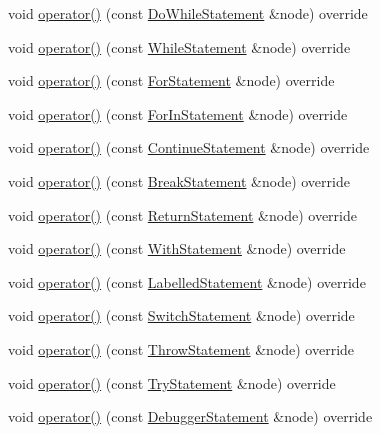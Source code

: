 \begin{DoxyCompactItemize}
\item 
void \hyperlink{struct_callable_visitor_a02bd47f3f8baf9ba24530d4622dc137d}{operator()} (const \hyperlink{struct_do_while_statement}{Do\+While\+Statement} \&node) override
\item 
void \hyperlink{struct_callable_visitor_adffa6fa6621caae9474604fafb91fdfd}{operator()} (const \hyperlink{struct_while_statement}{While\+Statement} \&node) override
\item 
void \hyperlink{struct_callable_visitor_a78b5cf2f0db8eb174097f4fcc8618b75}{operator()} (const \hyperlink{struct_for_statement}{For\+Statement} \&node) override
\item 
void \hyperlink{struct_callable_visitor_a45b8579f057d5566ad016f667cf2c068}{operator()} (const \hyperlink{struct_for_in_statement}{For\+In\+Statement} \&node) override
\item 
void \hyperlink{struct_callable_visitor_a15e41131b34e8d1a54b3af9719287248}{operator()} (const \hyperlink{struct_continue_statement}{Continue\+Statement} \&node) override
\item 
void \hyperlink{struct_callable_visitor_a3281651a229ad1e156aba9216bb64cec}{operator()} (const \hyperlink{struct_break_statement}{Break\+Statement} \&node) override
\item 
void \hyperlink{struct_callable_visitor_aebfd735e24e1161b3414d1bd5ad31cd5}{operator()} (const \hyperlink{struct_return_statement}{Return\+Statement} \&node) override
\item 
void \hyperlink{struct_callable_visitor_a08a6aec153b2e3b25b53642a6b9c7aab}{operator()} (const \hyperlink{struct_with_statement}{With\+Statement} \&node) override
\item 
void \hyperlink{struct_callable_visitor_a75929176e0ea51e67f01ed53d53bfa18}{operator()} (const \hyperlink{struct_labelled_statement}{Labelled\+Statement} \&node) override
\item 
void \hyperlink{struct_callable_visitor_a22380f6060601822b4c2f316d32c20a5}{operator()} (const \hyperlink{struct_switch_statement}{Switch\+Statement} \&node) override
\item 
void \hyperlink{struct_callable_visitor_af7d629f3f0fa66e3e8e38bd76c6cc729}{operator()} (const \hyperlink{struct_throw_statement}{Throw\+Statement} \&node) override
\item 
void \hyperlink{struct_callable_visitor_ae06c85aae9971525a8b880c5a398c8e3}{operator()} (const \hyperlink{struct_try_statement}{Try\+Statement} \&node) override
\item 
void \hyperlink{struct_callable_visitor_a5e2b63226fc91e23d9e59ec1ad4914c6}{operator()} (const \hyperlink{struct_debugger_statement}{Debugger\+Statement} \&node) override

\end{DoxyCompactItemize}

